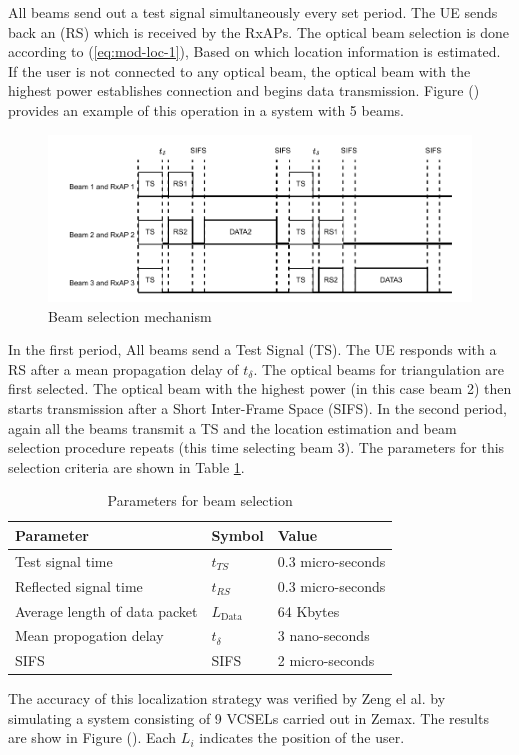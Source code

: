 All beams send out a test signal simultaneously every set period. The UE sends back an (RS) which is received by the RxAPs. The optical beam selection is done according to (\ref{eq:mod-loc-1}), Based on which location information is estimated. If the user is not connected to any optical beam, the optical beam with the highest power establishes connection and begins data transmission. Figure () provides an example of this operation in a system with 5 beams. 
\begin{figure}
    \centering
    \includegraphics[width=\linewidth]{Figures/RF-OW-modeling-User localization.drawio.pdf}
    \caption{Beam selection mechanism}
    \label{fig:mod-loc-beam-ac}
\end{figure}
In the first period, All beams send a Test Signal (TS). The UE responds with a RS after a mean propagation delay of $t_\delta$. The optical beams for triangulation are first selected. The optical beam with the highest power (in this case beam 2) then starts transmission after a Short Inter-Frame Space (SIFS). In the second period, again all the beams transmit a TS and the location estimation and beam selection procedure repeats (this time selecting beam 3).
The parameters for this selection criteria are shown in Table \ref{tab:mod-loc-params}.
\begin{table}[]
    \centering
    \begin{tabular}{|l|l|l|}
\hline
\textbf{Parameter}            & \textbf{Symbol}   & \textbf{Value}    \\ \hline
Test signal time              & $t_{TS}$          & 0.3 micro-seconds \\ \hline
Reflected signal time         & $t_{RS}$          & 0.3 micro-seconds \\ \hline
Average length of data packet\cite{khorov_tutorial_2019} & $L_{\text{Data}}$ & 64 Kbytes         \\ \hline
Mean propogation delay\cite{higgins_genetic_2009}        & $t_\delta$         & 3 nano-seconds    \\ \hline
SIFS\cite{khorov_tutorial_2019}                         & SIFS              & 2 micro-seconds   \\ \hline
\end{tabular}
    \caption{Parameters for beam selection\cite{zeng_vcsel_2022}}
    \label{tab:mod-loc-params}
\end{table}

The accuracy of this localization strategy was verified by Zeng el al. by simulating a system consisting of 9 VCSELs carried out in Zemax. The results are show in Figure (). Each $L_i$ indicates the position of the user. 